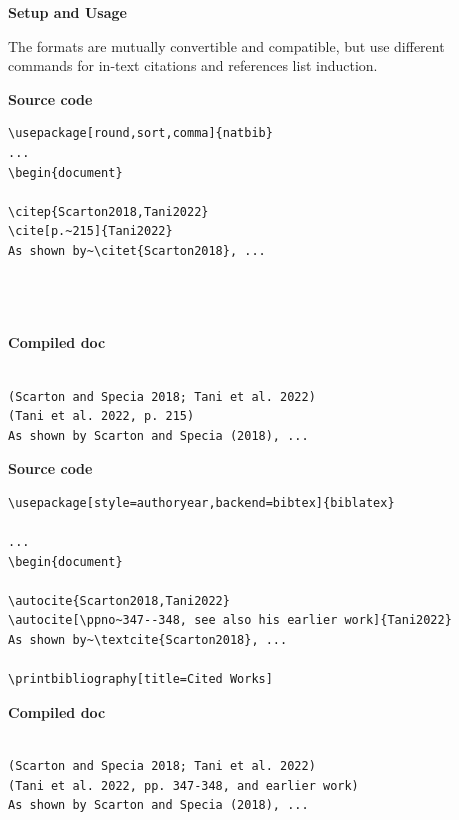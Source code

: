 \documentclass[a4paper,11pt]{article}
\begin{document}
{\Large{\textbf{Setup and Usage}}}

The formats are mutually convertible and compatible, but use different commands for in-text citations and references list induction.\\


\begin{tcolorbox}[colback=blue!5!white, colframe=blue!85!gray, title=\textbf{Bibtex},center title, toptitle=2mm, bottomtitle=2mm]
	
\begin{multicols}{2}
	
\textbf{Source code}
\begin{lstlisting}
\usepackage[round,sort,comma]{natbib}
...
\begin{document}

\citep{Scarton2018,Tani2022}
\cite[p.~215]{Tani2022}
As shown by~\citet{Scarton2018}, ...




\end{lstlisting}

\break 

\textbf{Compiled doc}
\begin{lstlisting}

(Scarton and Specia 2018; Tani et al. 2022)
(Tani et al. 2022, p. 215)
As shown by Scarton and Specia (2018), ...
\end{lstlisting}
	
\end{multicols}

\end{tcolorbox}

\begin{tcolorbox}[colback=yellow!5!white, coltitle=black, colframe=yellow!65!gray, title=\textbf{BibLaTex}, toptitle=2mm, bottomtitle=2mm, center title]
\begin{multicols}{2}
	
\textbf{Source code}
\begin{lstlisting}
\usepackage[style=authoryear,backend=bibtex]{biblatex}

...
\begin{document}

\autocite{Scarton2018,Tani2022}
\autocite[\ppno~347--348, see also his earlier work]{Tani2022}
As shown by~\textcite{Scarton2018}, ...

\printbibliography[title=Cited Works]

\end{lstlisting}

\break

\textbf{Compiled doc}
\begin{lstlisting}

(Scarton and Specia 2018; Tani et al. 2022)
(Tani et al. 2022, pp. 347-348, and earlier work)
As shown by Scarton and Specia (2018), ...
\end{lstlisting}

\end{multicols}
	
\end{tcolorbox}
\end{document}
